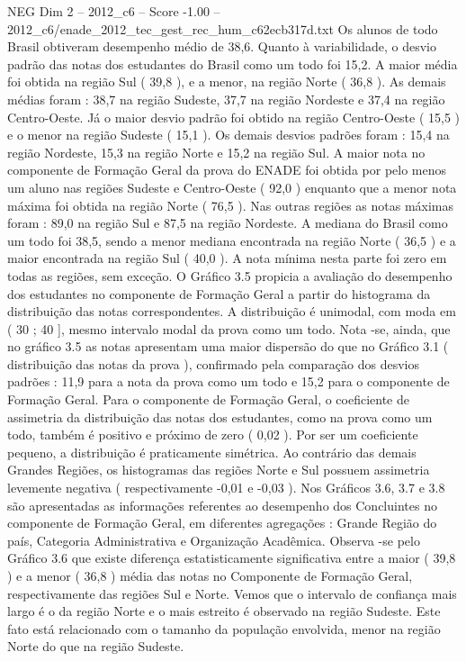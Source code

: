 \begin{textsample}{NEG Dim 2 – 2012\_c6 – Score -1.00 – 2012\_c6/enade\_2012\_tec\_gest\_rec\_hum\_c62ecb317d.txt}
Os alunos de todo Brasil obtiveram desempenho médio de 38,6.
Quanto à variabilidade, o desvio padrão das notas dos estudantes do Brasil como um todo foi 15,2.
A maior média foi obtida na região Sul ( 39,8 ), e a menor, na região Norte ( 36,8 ).
As demais médias foram : 38,7 na região Sudeste, 37,7 na região Nordeste e 37,4 na região Centro-Oeste.
Já o maior desvio padrão foi obtido na região Centro-Oeste ( 15,5 ) e o menor na região Sudeste ( 15,1 ).
Os demais desvios padrões foram : 15,4 na região Nordeste, 15,3 na região Norte e 15,2 na região Sul.
A maior nota no componente de Formação Geral da prova do ENADE foi obtida por pelo menos um aluno nas regiões Sudeste e Centro-Oeste ( 92,0 ) enquanto que a menor nota máxima foi obtida na região Norte ( 76,5 ).
Nas outras regiões as notas máximas foram : 89,0 na região Sul e 87,5 na região Nordeste.
A mediana do Brasil como um todo foi 38,5, sendo a menor mediana encontrada na região Norte ( 36,5 ) e a maior encontrada na região Sul ( 40,0 ).
A nota mínima nesta parte foi zero em todas as regiões, sem exceção.
O Gráfico 3.5 propicia a avaliação do desempenho dos estudantes no componente de Formação Geral a partir do histograma da distribuição das notas correspondentes.
A distribuição é unimodal, com moda em ( 30 ; 40 ], mesmo intervalo modal da prova como um todo.
Nota -se, ainda, que no gráfico 3.5 as notas apresentam uma maior dispersão do que no Gráfico 3.1 ( distribuição das notas da prova ), confirmado pela comparação dos desvios padrões : 11,9 para a nota da prova como um todo e 15,2 para o componente de Formação Geral.
Para o componente de Formação Geral, o coeficiente de assimetria da distribuição das notas dos estudantes, como na prova como um todo, também é positivo e próximo de zero ( 0,02 ).
Por ser um coeficiente pequeno, a distribuição é praticamente simétrica.
Ao contrário das demais Grandes Regiões, os histogramas das regiões Norte e Sul possuem assimetria levemente negativa ( respectivamente -0,01 e -0,03 ).
Nos Gráficos 3.6, 3.7 e 3.8 são apresentadas as informações referentes ao desempenho dos Concluintes no componente de Formação Geral, em diferentes agregações : Grande Região do país, Categoria Administrativa e Organização Acadêmica.
Observa -se pelo Gráfico 3.6 que existe diferença estatisticamente significativa entre a maior ( 39,8 ) e a menor ( 36,8 ) média das notas no Componente de Formação Geral, respectivamente das regiões Sul e Norte.
Vemos que o intervalo de confiança mais largo é o da região Norte e o mais estreito é observado na região Sudeste.
Este fato está relacionado com o tamanho da população envolvida, menor na região Norte do que na região Sudeste.

\end{textsample}
